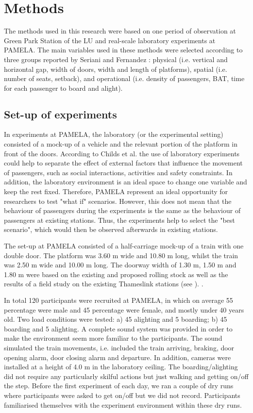 \section{Methods}
\label{sec:3}

The methods used in this research were based on one period of observation at Green Park Station of the LU and real-scale laboratory experiments at PAMELA. The main variables used in these methods were selected according to three groups reported by Seriani and Fernandez \cite{Ref1}: physical (i.e. vertical and horizontal gap, width of doors, width and length of platforms), spatial (i.e. number of seats, setback), and operational (i.e. density of passengers, BAT, time for each passenger to board and alight). 

\subsection{Set-up of experiments}
\label{sec:3.1}

In experiments at PAMELA, the laboratory (or the experimental setting) consisted of a mock-up of a vehicle and the relevant portion of the platform in front of the doors. According to Childs et al. \cite{Ref41} the use of laboratory experiments could help to separate the effect of external factors that influence the movement of passengers, such as social interactions, activities and safety constraints. In addition, the laboratory environment is an ideal space to change one variable and keep the rest fixed. Therefore, PAMELA represent an ideal opportunity for researchers to test "what if" scenarios. However, this does not mean that the behaviour of passengers during the experiments is the same as the behaviour of passengers at existing stations. Thus, the experiments help to select the "best scenario", which would then be observed afterwards in existing stations. 

The set-up at PAMELA consisted of a half-carriage mock-up of a train with one double door. The platform was 3.60 m wide and 10.80 m long, whilst the train was 2.50 m wide and 10.00 m long. The doorway width of 1.30 m, 1.50 m and 1.80 m were based on the existing and proposed rolling stock as well as the results of a field study on the existing Thameslink stations (see ). .

In total 120 participants were recruited at PAMELA, in which on average 55 percentage were male and 45 percentage were female, and mostly under 40 years old. Two load conditions were tested: a) 45 alighting and 5 boarding; b) 45 boarding and 5 alighting. A complete sound system was provided in order to make the environment seem more familiar to the participants. The sound simulated the train movements, i.e. included the train arriving, braking, door opening alarm, door closing alarm and departure. In addition, cameras were installed at a height of 4.0 m in the laboratory ceiling. The boarding/alighting did not require any particularly skilful actions but just walking and getting on/off the step. Before the first experiment of each day, we ran a couple of dry runs where participants were asked to get on/off but we did not record. Participants familiarised themselves with the experiment environment within these dry runs. 

